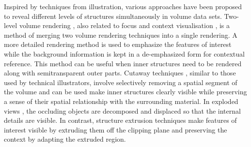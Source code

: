 Inspired by techniques from illustration, various approaches have been proposed to reveal different levels of structures simultaneously in volume data sets.
Two-level volume rendering \cite{hauser_two-level_2001} \cite{hadwiger_high-quality_2003} \cite{corcoran_perceptual_2010}, also related to focus and context visualisation \cite{wang_magic_2005} \cite{bruckner_illustrative_2006} \cite{chen_intelligent_2008}, is a method of merging two volume rendering techniques into a single rendering. A more detailed rendering method is used to emphasize the features of interest while the background information is kept in a de-emphasized form for contextual reference. This method can be useful when inner structures need to be rendered along with semitransparent outer parts.
Cutaway techniques \cite{burns_feature_2007} \cite{sigg_intelligent_2012}, similar to those used by technical illustrators, involve selectively removing a spatial segment of the volume and can be used make inner structures clearly visible while preserving a sense of their spatial relationship with the surrounding material.
In exploded views \cite{bruckner_exploded_2006}, the occluding objects are decomposed and displaced so that the internal details are visible.
In contrast, structure extrusion techniques \cite{diaz_adaptive_2012} make features of interest visible by extruding them off the clipping plane and preserving the context by adapting the extruded region.




